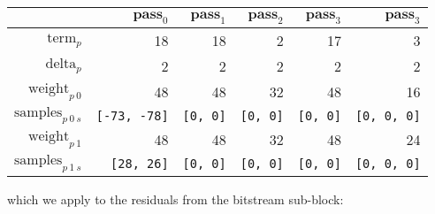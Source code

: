 \begin{table}[h]
{
  \begin{tabular}{|r|r|r|r|r|r|}
    \hline
    & $\textbf{pass}_0$ & $\textbf{pass}_1$ & $\textbf{pass}_2$ &
    $\textbf{pass}_3$ & $\textbf{pass}_3$ \\
    \hline
    $\text{term}_p$ & 18 & 18 & 2 & 17 & 3 \\
    $\text{delta}_p$ & 2 & 2 & 2 & 2 & 2 \\
    $\text{weight}_{p~0}$ & 48 & 48 & 32 & 48 & 16 \\
    $\text{samples}_{p~0~s}$ & \texttt{[-73, -78]} & \texttt{[0, 0]} &
    \texttt{[0, 0]} & \texttt{[0, 0]} & \texttt{[0, 0, 0]} \\
    $\text{weight}_{p~1}$ & 48 & 48 & 32 & 48 & 24 \\
    $\text{samples}_{p~1~s}$ & \texttt{[28, 26]} & \texttt{[0, 0]} &
    \texttt{[0, 0]} & \texttt{[0, 0]} & \texttt{[0, 0, 0]} \\
    \hline
  \end{tabular}
}
\end{table}
\par
\noindent
which we apply to the residuals from the bitstream sub-block:
\par
\noindent
